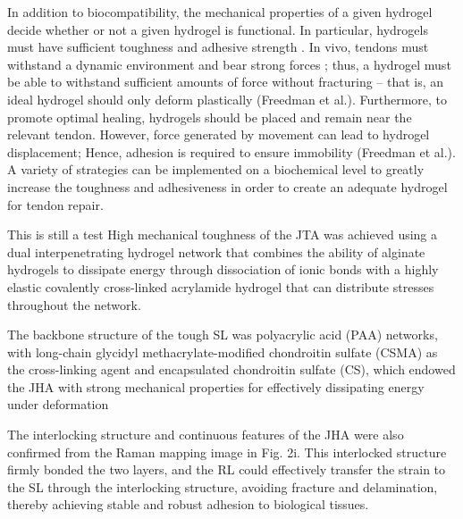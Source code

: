 In addition to biocompatibility, the mechanical properties of a given hydrogel decide whether or not a given hydrogel is functional. In particular, hydrogels must have sufficient toughness and adhesive strength \autocite{Freedman.EnhancedTendonHealing}. In vivo, tendons must withstand a dynamic environment and bear strong forces \autocite{Chen.AdvancesApplicationHydrogel}; thus, a hydrogel must be able to withstand sufficient amounts of force without fracturing – that is, an ideal hydrogel should only deform plastically (Freedman et al.). Furthermore, to promote optimal healing, hydrogels should be placed and remain near the relevant tendon. However, force generated by movement can lead to hydrogel displacement; Hence, adhesion is required to ensure immobility (Freedman et al.). A variety of strategies can be implemented on a biochemical level to greatly increase the toughness and adhesiveness in order to create an adequate hydrogel for tendon repair.

This is still a test
High mechanical toughness of the JTA was achieved using a dual interpenetrating hydrogel network that combines the ability of alginate hydrogels to dissipate energy through dissociation of ionic bonds with a highly elastic covalently cross-linked acrylamide hydrogel that can distribute stresses throughout the network. \cite{FreedmanEnhancedTendonHealing}

The backbone structure of the tough SL was polyacrylic acid (PAA) networks, with long-chain glycidyl methacrylate-modified chondroitin sulfate (CSMA) as the cross-linking agent and encapsulated chondroitin sulfate (CS), which endowed the JHA with strong mechanical properties for effectively dissipating energy under deformation \cite{JuSurfaceEnzymePolymerization}

The interlocking structure and continuous features of the JHA were also confirmed from the Raman mapping image in Fig. 2i. This interlocked structure firmly bonded the two layers, and the RL could effectively transfer the strain to the SL through the interlocking structure, avoiding fracture and delamination, thereby achieving stable and robust adhesion to biological tissues. \cite{JuSurfaceEnzymePolymerization}

